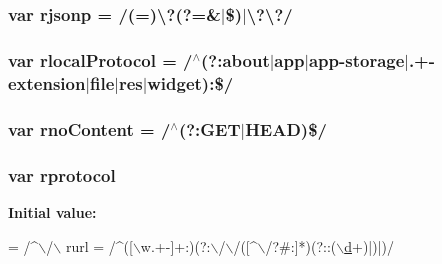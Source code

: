 \hypertarget{jquery-1_810_82_8js_a8b62e46075611fd1fc0bbb78b14d113a}{
\subsubsection[{rjsonp}]{\setlength{\rightskip}{0pt plus 5cm}var rjsonp = /(=)\textbackslash{}?(?=\&$\vert$\$)$\vert$\textbackslash{}?\textbackslash{}?/}}\label{jquery-1_810_82_8js_a8b62e46075611fd1fc0bbb78b14d113a}
\hypertarget{jquery-1_810_82_8js_af4dd13c90298bbf53ce08ec707dc9e2a}{
\subsubsection[{rlocal\-Protocol}]{\setlength{\rightskip}{0pt plus 5cm}var rlocal\-Protocol = /$^\wedge$(?\-:about$\vert$app$\vert$app-\/storage$\vert$.+-\/extension$\vert$file$\vert$res$\vert$widget)\-:\$/}}\label{jquery-1_810_82_8js_af4dd13c90298bbf53ce08ec707dc9e2a}
\hypertarget{jquery-1_810_82_8js_a537d744d72e31ec312aa3f16ef576d3f}{
\subsubsection[{rno\-Content}]{\setlength{\rightskip}{0pt plus 5cm}var rno\-Content = /$^\wedge$(?\-:G\-E\-T$\vert$H\-E\-A\-D)\$/}}\label{jquery-1_810_82_8js_a537d744d72e31ec312aa3f16ef576d3f}
\hypertarget{jquery-1_810_82_8js_a0f02b710647fcf95e74593954fb9b4cb}{
\subsubsection[{rprotocol}]{\setlength{\rightskip}{0pt plus 5cm}var rprotocol}}\label{jquery-1_810_82_8js_a0f02b710647fcf95e74593954fb9b4cb}
{\bfseries Initial value\-:}
\begin{DoxyCode}
= /^\(\backslash\)/\(\backslash\)
    rurl = /^([\(\backslash\)w.+-]+:)(?:\(\backslash\)/\(\backslash\)/([^\(\backslash\)/?#:]*)(?::(\hyperlink{bootstrap_8min_8js_aeb337d295abaddb5ec3cb34cc2e2bbc9}{\(\backslash\)d}+)|)|)/
\end{DoxyCode}
